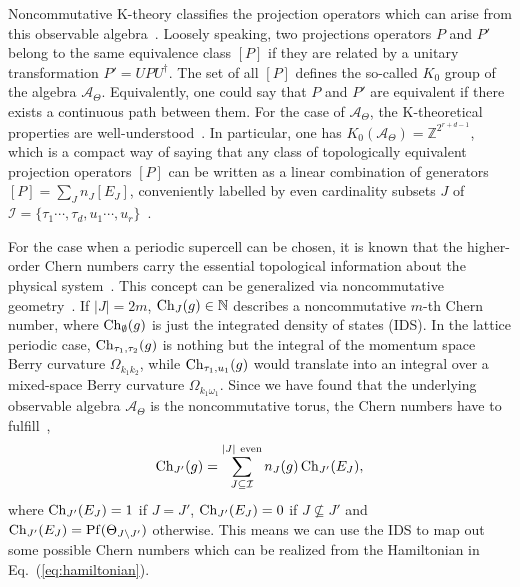 \documentclass[
    aps,
    prl,
    twocolumn,
    floatfix,
    superscriptaddress
]{revtex4-2}
\newcommand{\SupplementalMaterial}{\cite{Note1}}
\newcommand{\revise}[1]{{\color{blue}#1}}
\begin{document}
\revise{
Noncommutative K-theory classifies the projection operators which can arise from this observable algebra~\cite{Park2008,Blackadar1998, Connes1994}.
Loosely speaking, two projections operators $P$ and $P'$ belong to the same equivalence class $[P]$ if they are related by a unitary transformation $P' = U P U^\dagger $. 
The set of all $[P]$ defines the so-called $K_0$ group of the algebra $\mathcal{A}_\Theta$.
Equivalently, one could say that $P$ and $P'$ are equivalent if there exists a continuous path between them.
For the case of $\mathcal{A}_\Theta$, the K-theoretical properties are well-understood~\cite{X}.
In particular, one has $K_0( \mathcal{A}_\Theta) = \mathbb{Z}^{2^{r+d-1}}$, which is a compact way of saying that any class of topologically equivalent projection operators $[P]$ can be written as a linear combination of generators $[P] =\sum_J n_J [E_J]$, conveniently labelled by even cardinality subsets $J$ of $\mathcal{I}=\lbrace \tau_1 \cdots, \tau_d, u_1  \cdots, u_r \rbrace$~\SupplementalMaterial.
}

\revise{
For the case when a periodic supercell can be chosen, it is known that the higher-order Chern numbers carry the essential topological information about the physical system~\cite{Qi2008,Kraus2013}.
This concept can be generalized via noncommutative geometry~\cite{Liu2020, Prodan2016}.
If $|J| = 2 m $, ${\rm Ch}_{J} (g) \in \mathbb{N}$ describes a noncommutative $m$-th Chern number, where  ${\rm Ch}_{\emptyset} (g)$ is just the integrated density of states (IDS).
In the lattice periodic case, ${\rm Ch}_{{\tau_1, \tau_2}} (g)$ is nothing but the integral of the momentum space Berry curvature $\Omega_{k_1 k_2}$, while ${\rm Ch}_{{\tau_1, u_1}} (g)$ would translate into an integral over a mixed-space Berry curvature $\Omega_{k_1 \omega_1}$.
Since we have found that the underlying observable algebra $\mathcal{A}_\Theta$ is the noncommutative torus, the Chern numbers have to fulfill~\cite{Prodan2016},
\begin{equation}
   {\rm Ch}_{J'} (g) =  \sum_{J \subseteq \mathcal{I} }^{|J|~\mathrm{even}}  n_J(g) \, {\rm Ch}_{J'}(E_J),
   \label{eq:chern_expansion}
\end{equation}
where ${\rm Ch}_{J'}(E_J)=1$ if $J=J'$,  ${\rm Ch}_{J'}(E_J)=0$ if $J \not\subseteq J'$ and ${\rm Ch}_{J'}(E_J) = \mathrm{Pf}( \Theta_{J\setminus J'})$ otherwise.
This means we can use the IDS to map out some possible Chern numbers which can be realized from the Hamiltonian in Eq.~(\ref{eq:hamiltonian}).
}
\end{document}
